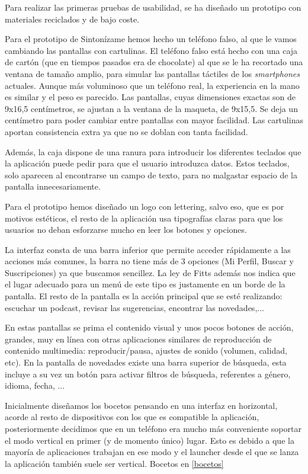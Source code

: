 \documentclass[a4paper]{article}
\begin{document}
Para realizar las primeras pruebas de usabilidad, se ha diseñado un prototipo con materiales reciclados y de bajo coste.

Para el prototipo de Sintonízame hemos hecho un teléfono falso, al que le vamos cambiando las pantallas con cartulinas. El teléfono falso está hecho con una caja de cartón (que en tiempos pasados era de chocolate) al que se le ha recortado una ventana de tamaño amplio, para simular las pantallas táctiles de los \textit{smartphones} actuales. Aunque más voluminoso que un teléfono real, la experiencia en la mano es similar y el peso es parecido. Las pantallas, cuyas dimensiones exactas son de 9x16,5 centímetros, se ajustan a la ventana de la maqueta, de 9x15,5. Se deja un centímetro para poder cambiar entre pantallas con mayor facilidad. Las cartulinas aportan consistencia extra ya que no se doblan con tanta facilidad.

Además, la caja dispone de una ranura para introducir los diferentes teclados que la aplicación puede pedir para que el usuario introduzca datos. Estos teclados, solo aparecen al encontrarse un campo de texto, para no malgastar espacio de la pantalla innecesariamente.

Para el prototipo hemos diseñado un logo con lettering, salvo eso, que es por motivos estéticos, el resto de la aplicación usa tipografías claras para que los usuarios no deban esforzarse mucho en leer los botones y opciones.

La interfaz consta de una barra inferior que permite acceder rápidamente a las acciones más comunes, la barra no tiene más de 3 opciones (Mi Perfil, Buscar y Suscripciones) ya que buscamos sencillez. La ley de Fitts además nos indica que el lugar adecuado para un menú de este tipo es justamente en un borde de la pantalla. El resto de la pantalla es la acción principal que se esté realizando: escuchar un podcast, revisar las sugerencias, encontrar las novedades,...

En estas pantallas se prima el contenido visual y unos pocos botones de acción, grandes, muy en línea con otras aplicaciones similares de reproducción de contenido multimedia: reproducir/pausa, ajustes de sonido (volumen, calidad, etc). En la pantalla de novedades existe una barra superior de búsqueda, esta incluye a su vez un botón para activar filtros de búsqueda, referentes a género, idioma, fecha, ...

Inicialmente diseñamos los bocetos pensando en una interfaz en horizontal, acorde al resto de dispositivos con los que es compatible la aplicación, posteriormente decidimos que en un teléfono era mucho más conveniente soportar el modo vertical en primer (y de momento único) lugar. Esto es debido a que la mayoría de aplicaciones trabajan en ese modo y el launcher desde el que se lanza la aplicación también suele ser vertical. Bocetos en \ref{bocetos}
\end{document}
